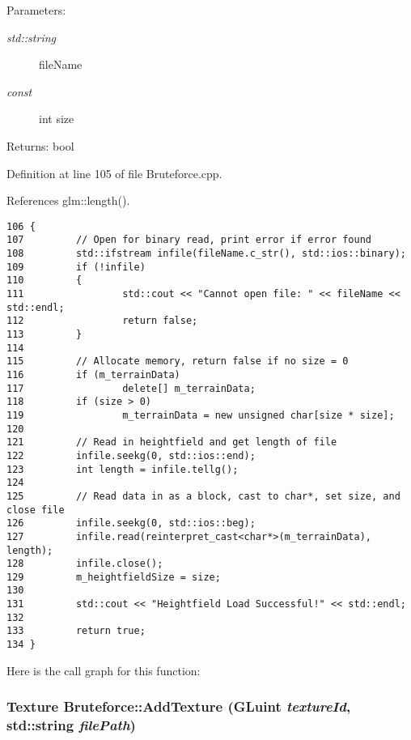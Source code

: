 \begin{Desc}
\item[Parameters:]
\begin{description}
\item[{\em std::string}]fileName \item[{\em const}]int size \end{description}
\end{Desc}
\begin{Desc}
\item[Returns:]bool \end{Desc}


Definition at line 105 of file Bruteforce.cpp.

References glm::length().

\begin{Code}\begin{verbatim}106 {
107         // Open for binary read, print error if error found
108         std::ifstream infile(fileName.c_str(), std::ios::binary);
109         if (!infile)
110         {
111                 std::cout << "Cannot open file: " << fileName << std::endl;
112                 return false;
113         }
114 
115         // Allocate memory, return false if no size = 0
116         if (m_terrainData)
117                 delete[] m_terrainData;
118         if (size > 0)
119                 m_terrainData = new unsigned char[size * size];
120 
121         // Read in heightfield and get length of file
122         infile.seekg(0, std::ios::end);
123         int length = infile.tellg();
124 
125         // Read data in as a block, cast to char*, set size, and close file
126         infile.seekg(0, std::ios::beg);
127         infile.read(reinterpret_cast<char*>(m_terrainData), length);
128         infile.close();
129         m_heightfieldSize = size;
130         
131         std::cout << "Heightfield Load Successful!" << std::endl;
132         
133         return true;
134 }
\end{verbatim}
\end{Code}




Here is the call graph for this function:\hypertarget{class_bruteforce_f4877e16df806562170ba403dc67298f}{
\subsubsection[AddTexture]{\setlength{\rightskip}{0pt plus 5cm}Texture Bruteforce::AddTexture (GLuint {\em textureId}, \/  std::string {\em filePath})}}
\label{class_bruteforce_f4877e16df806562170ba403dc67298f}


